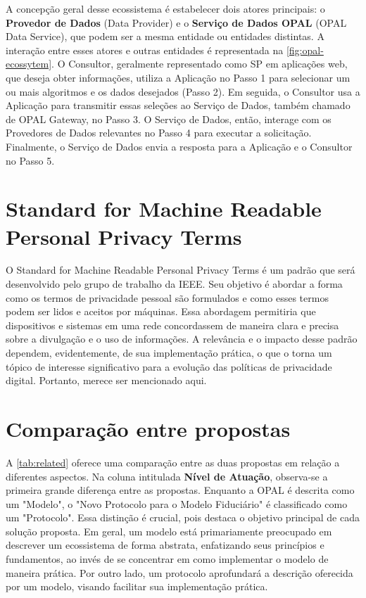 A concepção geral desse ecossistema é estabelecer dois atores principais: o \textbf{Provedor de Dados} (Data Provider) e o \textbf{Serviço de Dados \acs{OPAL}} (OPAL Data Service), que podem ser a mesma entidade ou entidades distintas. A interação entre esses atores e outras entidades é representada na \autoref{fig:opal-ecossytem}. O Consultor, geralmente representado como \acs{SP} em aplicações web, que deseja obter informações, utiliza a Aplicação no Passo 1 para selecionar um ou mais algoritmos e os dados desejados (Passo 2). Em seguida, o Consultor usa a Aplicação para transmitir essas seleções ao Serviço de Dados, também chamado de OPAL Gateway, no Passo 3. O Serviço de Dados, então, interage com os Provedores de Dados relevantes no Passo 4 para executar a solicitação. Finalmente, o Serviço de Dados envia a resposta para a Aplicação e o Consultor no Passo 5.



\section{Standard for Machine Readable Personal Privacy Terms}

O Standard for Machine Readable Personal Privacy Terms é um padrão que será desenvolvido pelo grupo de trabalho  da IEEE. Seu objetivo é abordar a forma como os termos de privacidade pessoal são formulados e como esses termos podem ser lidos e aceitos por máquinas. Essa abordagem permitiria que dispositivos e sistemas em uma rede concordassem de maneira clara e precisa sobre a divulgação e o uso de informações. A relevância e o impacto desse padrão dependem, evidentemente, de sua implementação prática, o que o torna um tópico de interesse significativo para a evolução das políticas de privacidade digital. Portanto, merece ser mencionado aqui.

\section{Comparação entre propostas}



A \autoref{tab:related} oferece uma comparação entre as duas propostas em relação a diferentes aspectos. Na coluna intitulada \textbf{Nível de Atuação}, observa-se a primeira grande diferença entre as propostas. Enquanto a \acs{OPAL} é descrita como um "Modelo", o "Novo Protocolo para o Modelo Fiduciário" é classificado como um "Protocolo". Essa distinção é crucial, pois destaca o objetivo principal de cada solução proposta. Em geral, um modelo está primariamente preocupado em descrever um ecossistema de forma abstrata, enfatizando seus princípios e fundamentos, ao invés de se concentrar em como implementar o modelo de maneira prática. Por outro lado, um protocolo aprofundará a descrição oferecida por um modelo, visando facilitar sua implementação prática.


